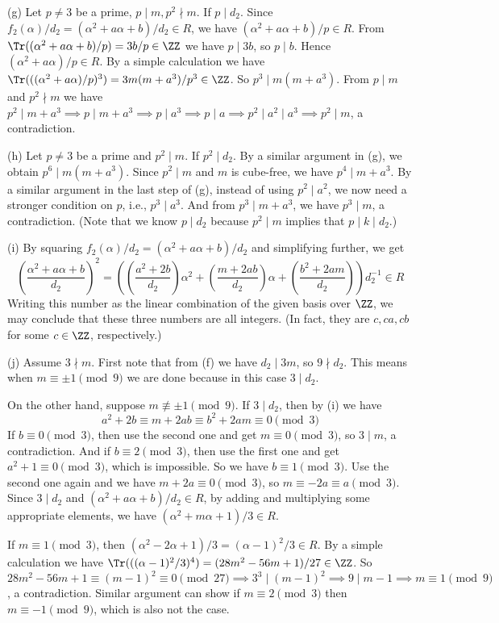 \documentclass[../Chapter.tex]{subfiles}
\begin{document}
(g) Let $p\neq 3$ be a prime, $p\mid m,p^2\nmid m$. If $p\mid d_2$. Since $f_2(\alpha)/d_2=(\alpha^2+a\alpha+b)/d_2\in R$, we have $(\alpha^2+a\alpha+b)/p\in R$. From $\Tr((\alpha^2+a\alpha+b)/p)=3b/p\in\ZZ$ we have $p\mid 3b$, so $p\mid b$. Hence $(\alpha^2+a\alpha)/p\in R$. By a simple calculation we have $\Tr(((\alpha^2+a\alpha)/p)^3) = 3m(m+a^3)/p^3\in\ZZ$. So $p^3\mid m(m+a^3)$. From $p\mid m$ and $p^2\nmid m$ we have $p^2\mid m+a^3\implies p\mid m+a^3\implies p\mid a^3\implies p\mid a\implies p^2\mid a^2\mid a^3\implies p^2\mid m$, a contradiction.

(h) Let $p\neq 3$ be a prime and $p^2\mid m$. If $p^2\mid d_2$. By a similar argument in (g), we obtain $p^6\mid m(m+a^3)$. Since $p^2\mid m$ and $m$ is cube-free, we have $p^4\mid m+a^3$. By a similar argument in the last step of (g), instead of using $p^2\mid a^2$, we now need a stronger condition on $p$, i.e., $p^3\mid a^3$. And from $p^3\mid m+a^3$, we have $p^3\mid m$, a contradiction. (Note that we know $p\mid d_2$ because $p^2\mid m$ implies that $p\mid k\mid d_2$.)

(i) By squaring $f_2(\alpha)/d_2=(\alpha^2+a\alpha+b)/d_2$ and simplifying further, we get
$$\left(\frac{\alpha^2+a\alpha+b}{d_2}\right)^2=\left(\left(\frac{a^2+2b}{d_2}\right)\alpha^2+\left(\frac{m+2ab}{d_2}\right)\alpha+\left(\frac{b^2+2am}{d_2}\right)\right) d_2^{-1}\in R$$
Writing this number as the linear combination of the given basis over $\ZZ$, we may conclude that these three numbers are all integers. (In fact, they are $c,ca,cb$ for some $c\in\ZZ$, respectively.)

(j) Assume $3\nmid m$. First note that from (f) we have $d_2\mid 3m$, so $9\nmid d_2$. This means when $m\equiv \pm1 \pmod{9}$ we are done because in this case $3\mid d_2$.

On the other hand, suppose $m\not\equiv \pm1 \pmod{9}$. If $3\mid d_2$, then by (i) we have $$a^2+2b\equiv m+2ab\equiv b^2+2am \equiv 0 \pmod{3}$$ If $b\equiv 0\pmod{3}$, then use the second one and get $m\equiv 0\pmod{3}$, so $3\mid m$, a contradiction. And if $b\equiv 2\pmod{3}$, then use the first one and get $a^2+1\equiv 0\pmod{3}$, which is impossible. So we have $b\equiv 1\pmod{3}$. Use the second one again and we have $m+2a\equiv 0\pmod{3}$, so $m\equiv -2a\equiv a \pmod{3}$. Since $3\mid d_2$ and $(\alpha^2+a\alpha+b)/d_2\in R$, by adding and multiplying some appropriate elements, we have $(\alpha^2+m\alpha+1)/3\in R$.

If $m\equiv 1\pmod{3}$, then $(\alpha^2-2\alpha+1)/3=(\alpha-1)^2/3\in R$. By a simple calculation we have $\Tr(((\alpha-1)^2/3)^4) = (28m^2-56m+1)/27\in\ZZ$. So $28m^2-56m+1\equiv (m-1)^2 \equiv 0\pmod{27}\implies 3^3\mid (m-1)^2\implies 9\mid m-1\implies m\equiv 1\pmod{9}$, a contradiction. Similar argument can show if $m\equiv 2\pmod{3}$ then $m\equiv -1\pmod{9}$, which is also not the case.
\end{document}
